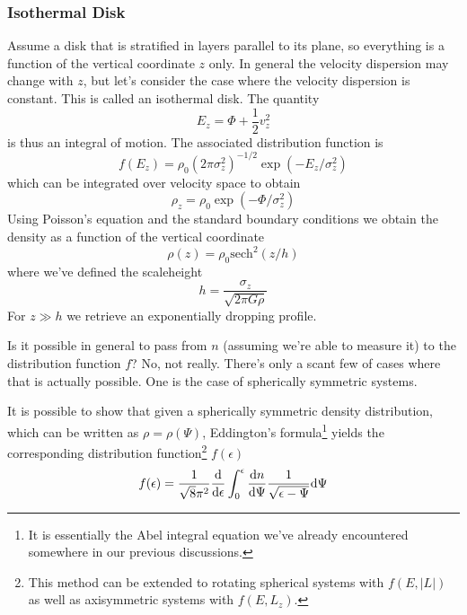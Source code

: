 \subsubsection*{Isothermal Disk}

Assume a disk that is stratified in layers parallel to its plane, so everything is a function of the vertical coordinate $z$ only. In general the velocity dispersion may change with $z$, but let's consider the case where the velocity dispersion is constant. This is called an isothermal disk. The quantity
\begin{equation*}
    E_{z} = \Phi + \frac{1}{2}v_{z}^{2}
\end{equation*}
is thus an integral of motion. The associated distribution function is 
\begin{equation*}
    f(E_{z}) = \rho_{0}(2\pi\sigma_{z}^{2})^{-1/2}\exp(-E_{z}/\sigma_{z}^{2})
\end{equation*}
which can be integrated over velocity space to obtain 
\begin{equation*}
    \rho_{z} = \rho_{0}\exp(-\Phi/\sigma_{z}^{2})
\end{equation*}
Using Poisson's equation and the standard boundary conditions we obtain the density as a function of the vertical coordinate 
\begin{equation*}
    \rho(z) = \rho_{0}\text{sech}^{2}(z/h)
\end{equation*}
where we've defined the scaleheight
\begin{equation*}
    h = \frac{\sigma_{z}}{\sqrt{2\pi G \rho}}
\end{equation*}
For $z \gg h$ we retrieve an exponentially dropping profile.
\par Is it possible in general to pass from $n$ (assuming we're able to measure it) to the distribution function $f$? No, not really. There's only a scant few of cases where that is actually possible. One is the case of spherically symmetric systems.
\par It is possible to show that given a spherically symmetric density distribution, which can be written as $\rho = \rho(\Psi)$, Eddington’s formula\footnote{It is essentially the Abel integral equation we've already encountered somewhere in our previous discussions.} yields the corresponding distribution function\footnote{This method can be extended to rotating spherical systems with $f(E, |L|)$ as well as axisymmetric systems with $f(E, L_{z})$.} $f(\epsilon)$
\begin{equation}
    f(\epsilon) = \frac{1}{\sqrt{8}\pi^{2}}\frac{\text{d}}{\text{d}\epsilon}\int_{0}^{\epsilon}\frac{\text{d}n}{\text{d}\Psi}\frac{1}{\sqrt{\epsilon - \Psi}}\text{d}\Psi
\end{equation}

